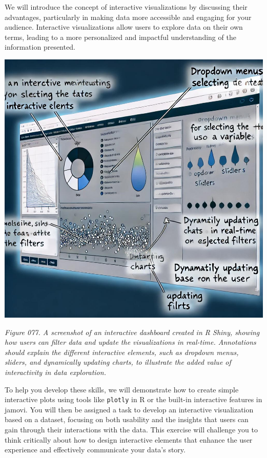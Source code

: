 \documentclass[
]{book}
\begin{document}
We will introduce the concept of interactive visualizations by discussing their advantages, particularly in making data more accessible and engaging for your audience. Interactive visualizations allow users to explore data on their own terms, leading to a more personalized and impactful understanding of the information presented.

\includegraphics[width=1\textwidth,height=\textheight]{images/fig077.jpg}

\emph{Figure 077. A screenshot of an interactive dashboard created in R Shiny, showing how users can filter data and update the visualizations in real-time. Annotations should explain the different interactive elements, such as dropdown menus, sliders, and dynamically updating charts, to illustrate the added value of interactivity in data exploration.}

To help you develop these skills, we will demonstrate how to create simple interactive plots using tools like \texttt{plotly} in R or the built-in interactive features in jamovi. You will then be assigned a task to develop an interactive visualization based on a dataset, focusing on both usability and the insights that users can gain through their interactions with the data. This exercise will challenge you to think critically about how to design interactive elements that enhance the user experience and effectively communicate your data's story.
\end{document}
